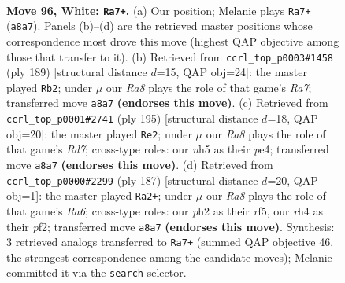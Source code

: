 \documentclass[11pt]{article}
\begin{document}
\clearpage

\begin{figure}[p]\centering
\begin{subfigure}{0.46\textwidth}\centering
\resizebox{\linewidth}{!}{%
\newchessgame
\chessboard[
  setfen={R7/3k4/8/7n/p6r/P7/7p/7K w - - 18 96},
  showmover=false,
  pgfstyle=straightmove, color=movearrow, markmove={a8-a7}
]}
\caption{}
\end{subfigure}\hfill
\begin{subfigure}{0.46\textwidth}\centering
\resizebox{\linewidth}{!}{%
\newchessgame
\chessboard[
  setfen={8/8/4K3/pPk5/P5R1/8/r7/8 b - - 88 95},
  showmover=false,
  pgfstyle=straightmove, color=movearrow, markmove={a2-b2}
]}
\caption{}
\end{subfigure}
\\[4pt]
\begin{subfigure}{0.46\textwidth}\centering
\resizebox{\linewidth}{!}{%
\newchessgame
\chessboard[
  setfen={8/6k1/4R1P1/2K5/4P3/8/3r4/8 b - - 72 98},
  showmover=false,
  pgfstyle=straightmove, color=movearrow, markmove={d2-e2}
]}
\caption{}
\end{subfigure}\hfill
\begin{subfigure}{0.46\textwidth}\centering
\resizebox{\linewidth}{!}{%
\newchessgame
\chessboard[
  setfen={8/8/7k/5R2/6p1/r5P1/3K1P2/8 b - - 93 94},
  showmover=false,
  pgfstyle=straightmove, color=movearrow, markmove={a3-a2}
]}
\caption{}
\end{subfigure}
\caption{\textbf{Move 96, White: \texttt{Ra7+}.} (a) Our position; Melanie plays \texttt{Ra7+} (\texttt{a8a7}). Panels (b)--(d) are the retrieved master positions whose correspondence most drove this move (highest QAP objective among those that transfer to it). (b) Retrieved from \texttt{ccrl\_top\_p0003\#1458} (ply 189) [structural distance $d$=15, QAP obj=24]: the master played \texttt{Rb2}; under $\mu$ our \emph{Ra8} plays the role of that game's \emph{Ra7}; transferred move \texttt{a8a7} \textbf{(endorses this move)}. (c) Retrieved from \texttt{ccrl\_top\_p0001\#2741} (ply 195) [structural distance $d$=18, QAP obj=20]: the master played \texttt{Re2}; under $\mu$ our \emph{Ra8} plays the role of that game's \emph{Rd7}; cross-type roles: our \emph{n}h5 as their \emph{p}e4; transferred move \texttt{a8a7} \textbf{(endorses this move)}. (d) Retrieved from \texttt{ccrl\_top\_p0000\#2299} (ply 187) [structural distance $d$=20, QAP obj=1]: the master played \texttt{Ra2+}; under $\mu$ our \emph{Ra8} plays the role of that game's \emph{Ra6}; cross-type roles: our \emph{p}h2 as their \emph{r}f5, our \emph{r}h4 as their \emph{p}f2; transferred move \texttt{a8a7} \textbf{(endorses this move)}. Synthesis: 3 retrieved analogs transferred to \texttt{Ra7+} (summed QAP objective 46, the strongest correspondence among the candidate moves); Melanie committed it via the \texttt{search} selector.}
\label{fig:thought-m190}
\end{figure}
\end{document}
